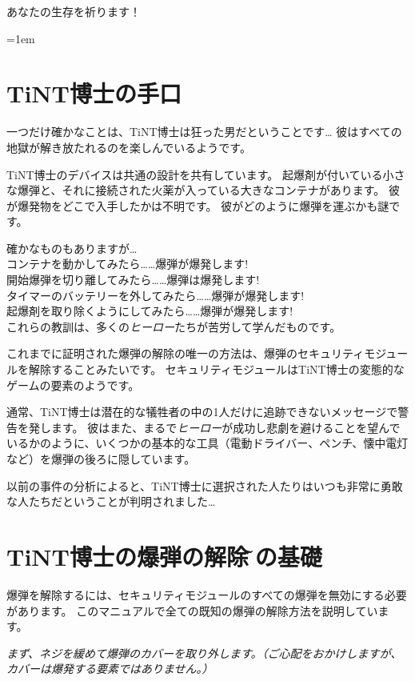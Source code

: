 \vspace{1em}
あなたの生存を祈ります！

%
\parskip=1em
\vspace*{-20mm}
\section*{TiNT博士の手口}
一つだけ確かなことは{、}TiNT博士は狂った男だということです… 彼はすべての地獄が解き放たれるのを楽しんでいるようです。

TiNT博士のデバイスは共通の設計を共有しています。%
起爆剤が付いている小さな爆弾と、それに接続された火薬が入っている大きなコンテナがあります。%
彼が爆発物をどこで入手したかは不明です。%
彼がどのように爆弾を運ぶかも謎です。%

確かなものもありますが…\\
コンテナを動かしてみたら……爆弾が爆発します!\\
開始爆弾を切り離してみたら……爆弾は爆発します!\\
タイマーのバッテリーを外してみたら……爆弾が爆発します!\\
起爆剤を取り除くようにしてみたら……爆弾が爆発します!\\
これらの教訓は、多くの\textit{ヒーロー}たちが苦労して学んだものです。%

これまでに証明された爆弾の解除の唯一の方法は、爆弾のセキュリティモジュールを解除することみたいです。%
セキュリティモジュールはTiNT博士の変態的なゲームの要素のようです。

通常{、}TiNT博士は潜在的な犠牲者の中の1人だけに追跡できないメッセージで警告を発します。%
彼はまた{、}まるで\textit{ヒーロー}が成功し悲劇を避けることを望んでいるかのように、いくつかの基本的な工具（電動ドライバー、ペンチ、懐中電灯など）を爆弾の後ろに隠しています。%

以前の事件の分析によると{、}TiNT博士に選択された人たりはいつも非常に勇敢な人たちだということが判明されました…

\newpage
\section*{TiNT博士の爆弾の解除\~その基礎}

爆弾を解除するには、セキュリティモジュールのすべての爆弾を無効にする必要があります。%
このマニュアルで全ての既知の爆弾の解除方法を説明しています。%

\textit{まず、ネジを緩めて爆弾のカバーを取り外します。（ご心配をおかけしますが、カバーは爆発する要素ではありません。）}

